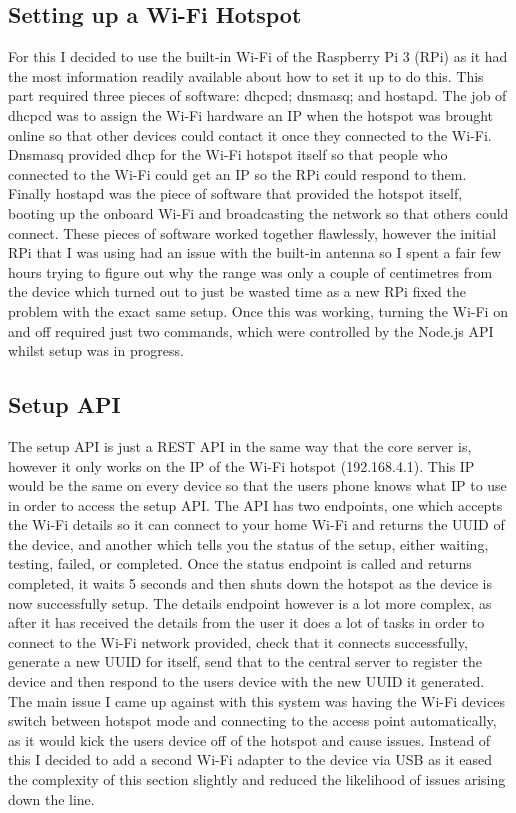 \subsection{Setting up a Wi-Fi Hotspot}
For this I decided to use the built-in Wi-Fi of the Raspberry Pi 3 (RPi) as it had the most information readily available about how to set it up to do this. This part required three pieces of software: dhcpcd; dnsmasq; and hostapd. The job of dhcpcd was to assign the Wi-Fi hardware an IP when the hotspot was brought online so that other devices could contact it once they connected to the Wi-Fi. Dnsmasq provided dhcp for the Wi-Fi hotspot itself so that people who connected to the Wi-Fi could get an IP so the RPi could respond to them. Finally hostapd was the piece of software that provided the hotspot itself, booting up the onboard Wi-Fi and broadcasting the network so that others could connect. These pieces of software worked together flawlessly, however the initial RPi that I was using had an issue with the built-in antenna so I spent a fair few hours trying to figure out why the range was only a couple of centimetres from the device which turned out to just be wasted time as a new RPi fixed the problem with the exact same setup. Once this was working, turning the Wi-Fi on and off required just two commands, which were controlled by the Node.js API whilst setup was in progress.

\subsection{Setup API}
The setup API is just a REST API in the same way that the core server is, however it only works on the IP of the Wi-Fi hotspot (192.168.4.1). This IP would be the same on every device so that the users phone knows what IP to use in order to access the setup API. The API has two endpoints, one which accepts the Wi-Fi details so it can connect to your home Wi-Fi and returns the UUID of the device, and another which tells you the status of the setup, either waiting, testing, failed, or completed. Once the status endpoint is called and returns completed, it waits 5 seconds and then shuts down the hotspot as the device is now successfully setup. The details endpoint however is a lot more complex, as after it has received the details from the user it does a lot of tasks in order to connect to the Wi-Fi network provided, check that it connects successfully, generate a new UUID for itself, send that to the central server to register the device and then respond to the users device with the new UUID it generated. The main issue I came up against with this system was having the Wi-Fi devices switch between hotspot mode and connecting to the access point automatically, as it would kick the users device off of the hotspot and cause issues. Instead of this I decided to add a second Wi-Fi adapter to the device via USB as it eased the complexity of this section slightly and reduced the likelihood of issues arising down the line.

